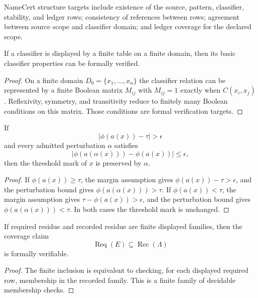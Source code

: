 \begin{definition}
\label{def:philosophy-namecert-structure-verification-targets}
NameCert structure targets include existence of the source, pattern,
classifier, stability, and ledger rows; consistency of references
between rows; agreement between source scope and classifier domain; and
ledger coverage for the declared scope.
\end{definition}

\begin{theorem}
\label{thm:philosophy-finite-classifier-tables-verifiable}
If a classifier is displayed by a finite table on a finite domain, then
its basic classifier properties can be formally verified.
\end{theorem}
\begin{proof}
On a finite domain $D_0=\{x_1,\ldots,x_n\}$ the classifier relation can
be represented by a finite Boolean matrix $M_{ij}$ with
$M_{ij}=1$ exactly when $C(x_i,x_j)$. Reflexivity, symmetry, and
transitivity reduce to finitely many Boolean conditions on this matrix.
Those conditions are formal verification targets.
\end{proof}

\begin{theorem}
\label{thm:philosophy-margin-stability-verifiable}
If
$$
|\phi(a(x))-\tau|>\epsilon
$$
and every admitted perturbation $\alpha$ satisfies
$$
|\phi(a(\alpha(x)))-\phi(a(x))|\leq\epsilon,
$$
then the threshold mark of $x$ is preserved by $\alpha$.
\end{theorem}
\begin{proof}
If $\phi(a(x))\geq\tau$, the margin assumption gives
$\phi(a(x))-\tau>\epsilon$, and the perturbation bound gives
$\phi(a(\alpha(x)))>\tau$. If $\phi(a(x))<\tau$, the margin assumption
gives $\tau-\phi(a(x))>\epsilon$, and the perturbation bound gives
$\phi(a(\alpha(x)))<\tau$. In both cases the threshold mark is
unchanged.
\end{proof}

\begin{theorem}
\label{thm:philosophy-finite-ledger-coverage-verifiable}
If required residue and recorded residue are finite displayed families,
then the coverage claim
$$
\operatorname{Req}(E)\subseteq\operatorname{Rec}(\Lambda)
$$
is formally verifiable.
\end{theorem}
\begin{proof}
The finite inclusion is equivalent to checking, for each displayed
required row, membership in the recorded family. This is a finite family
of decidable membership checks.
\end{proof}

